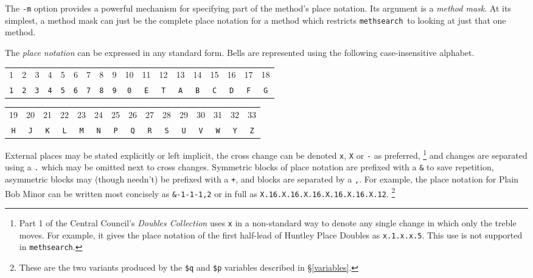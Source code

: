 \documentclass[a4paper,11pt,oneside]{book}
\makeatletter
\def\textitidx#1{\textit{#1}\index{#1}}
\newcommand{\oidx}[2]{\index{#1@{\hspace*{-\optwidth}\texttt{-}#2}|ulink}}
\newcommand{\oid}[2]{\oidx{#1}{\texttt{#1}}%
  \index{#2@{\hspace*{-\loptwidth}\texttt{--#2}}|see{\texttt{-#1}}}}
\newcommand{\symidx}[2]{} %
\def\methsearch{\texttt{meth\-search}}
\newcommand{\sref}[1]{\hyperref[#1]{\S\ref{#1}}}
\makeatother
\begin{document}
The \verb+-m+ option\oid{m}{mask} provides a 
powerful mechanism for specifying part
of the method's place notation.  Its argument is a \textitidx{method mask}. 
At its simplest, a method mask can just be the complete place notation for 
a method which restricts \methsearch\ to looking at just that one method.

The \textit{place notation} can be expressed in any standard form.  
Bells are represented using the following case-insensitive alphabet.

{\footnotesize\begin{tabular}{cccccccccc cccccccc}
1&2&3&4&5&6&7&8&9&10&11&12&13&14&15&16&17&18\\
\texttt{1}&\texttt{2}&\texttt{3}&\texttt{4}&\texttt{5}&\texttt{6}&\texttt{7}&\texttt{8}&\texttt{9}&\texttt{0}&\texttt{E}&\texttt{T}&\texttt{A}&\texttt{B}&\texttt{C}&\texttt{D}&\texttt{F}&\texttt{G}\\
\end{tabular}}

{\footnotesize\begin{tabular}{cc cccccccccc ccc}
19&20&21&22&23&24&25&26&27&28&29&30&31&32&33\\
\texttt{H}&\texttt{J}&\texttt{K}&\texttt{L}&\texttt{M}&\texttt{N}&\texttt{P}&\texttt{Q}&\texttt{R}&\texttt{S}&\texttt{U}&\texttt{V}&\texttt{W}&\texttt{Y}&\texttt{Z}\\
\end{tabular}}

External places may be stated
explicitly or left implicit, the cross change can be denoted \verb+x+, 
\verb+X+ or \verb+-+ as preferred,%
\symidx{-}{cross change}%
\footnote{Part 1 of the Central Council's \textit{Doubles Collection}
uses \verb+x+ in a non-standard way to denote any single change in which only
the treble moves.  For example, it gives the place notation of the first 
half-lead of Huntley Place Doubles as \texttt{x.1.x.x.5}. 
This use is not supported in \methsearch.}
and changes are separated using a \verb+.+\symidx{.}{place notation} 
which may be omitted next to cross
changes.  Symmetric blocks of place notation are prefixed with a 
\verb+&+\symidx{\&}{place notation} to save repetition, asymmetric blocks 
may (though needn't) be prefixed with a \verb-+-,\symidx{+}{place notation} 
and blocks are separated by a \verb+,+.\symidx{,}{place notation}  For example,
the place notation for Plain Bob Minor can be written most concisely
as \verb+&-1-1-1,2+ or in full as \verb-X.16.X.16.X.16.X.16.X.16.X.12-.%
\footnote{These are the two variants produced by the \verb+$q+ and
\verb+$p+ variables described in \sref{variables}.}
\end{document}
